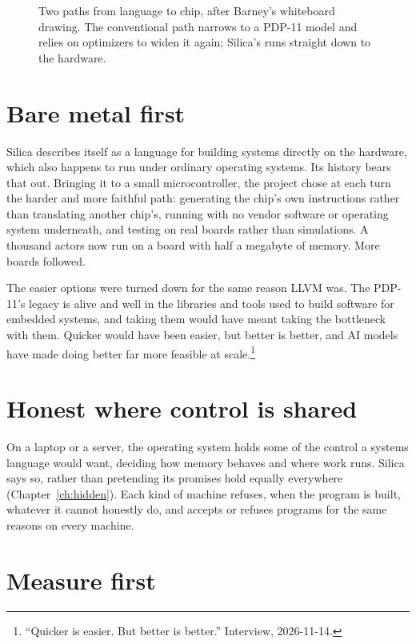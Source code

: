 \begin{figure}[htbp]
  \centering
  
  \caption{Two paths from language to chip, after Barney's whiteboard drawing.
    The conventional path narrows to a PDP-11 model and relies on optimizers to
    widen it again; Silica's runs straight down to the hardware.}
  \label{fig:hourglass}
\end{figure}

\section{Bare metal first}

Silica describes itself as a language for building systems directly on the
hardware, which also happens to run under ordinary operating systems. Its
history bears that out. Bringing it to a small microcontroller, the project
chose at each turn the harder and more faithful path: generating the chip's own
instructions rather than translating another chip's, running with no vendor
software or operating system underneath, and testing on real boards rather
than simulations. A thousand actors now run on a board with half a megabyte of
memory. More boards followed.

The easier options were turned down for the same reason LLVM was. The PDP-11's
legacy is alive and well in the libraries and tools used to build software for
embedded systems, and taking them would have meant taking the bottleneck with
them. Quicker would have been easier, but better is better, and AI models have
made doing better far more feasible at scale.\footnote{``Quicker is easier. But
better is better.'' Interview, 2026-11-14.}

\section{Honest where control is shared}

On a laptop or a server, the operating system holds some of the control a
systems language would want, deciding how memory behaves and where work runs.
Silica says so, rather than pretending its promises hold equally everywhere
(Chapter~\ref{ch:hidden}). Each kind of machine refuses, when the program is
built, whatever it cannot honestly do, and accepts or refuses programs for the
same reasons on every machine.

\section{Measure first}

